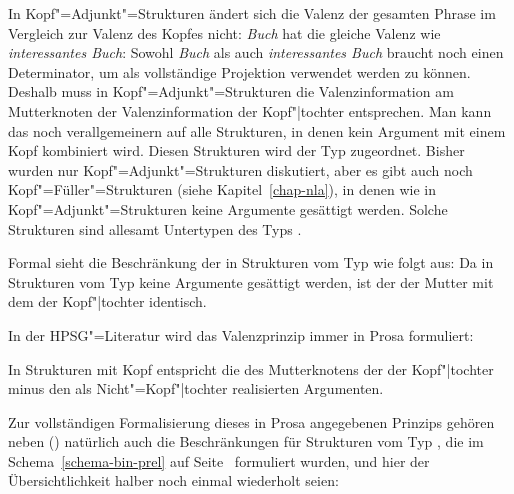 In Kopf"=Adjunkt"=Strukturen ändert sich die Valenz der gesamten Phrase im Vergleich
zur Valenz des Kopfes nicht: \emph{Buch} hat die gleiche Valenz wie \emph{interessantes Buch}:
Sowohl \emph{Buch} als auch \emph{interessantes Buch} braucht noch einen Determinator, um als
vollständige Projektion verwendet werden zu können.
Deshalb muss in Kopf"=Adjunkt"=Strukturen die Valenzinformation am Mutterknoten der Valenzinformation 
der Kopf"|tochter entsprechen. Man kann das noch verallgemeinern auf alle Strukturen, in denen
kein Argument mit einem Kopf kombiniert wird. Diesen Strukturen wird der Typ 
zugeordnet. Bisher wurden nur Kopf"=Adjunkt"=Strukturen diskutiert, aber es gibt \zb auch
noch Kopf"=Füller"=Strukturen (siehe Kapitel~\ref{chap-nla}), in denen wie in Kopf"=Adjunkt"=Strukturen
keine Argumente gesättigt werden. Solche Strukturen sind allesamt Untertypen des Typs .

Formal sieht die Beschränkung der \compswe in Strukturen vom Typ 
wie folgt aus:
\ea
\label{def-head-non-arg-phrase}
 \impl
{}
\z
Da in Strukturen vom Typ 
keine Argumente gesättigt werden, ist der \compsw der Mutter mit dem der Kopf"|tochter identisch.

In der HPSG"=Literatur wird das Valenzprinzip immer in Prosa formuliert:

\begin{prinzip-break}[Valenzprinzip]
In Strukturen mit Kopf entspricht die \compsl des Mutterknotens der \compsl der Kopf"|tochter
minus den als Nicht"=Kopf"|tochter realisierten Argumenten.
\end{prinzip-break}

\noindent
Zur vollständigen Formalisierung dieses in Prosa angegebenen Prinzips gehören neben ()
natürlich auch die Beschränkungen für Strukturen vom Typ , die im
Schema~\ref{schema-bin-prel} auf Seite~\pageref{schema-bin-prel} formuliert wurden, und hier der
Übersichtlichkeit halber noch einmal wiederholt seien:
\ea
{} \impl\\
\z

